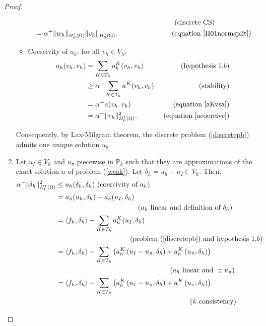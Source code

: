 \begin{proof}
\begin{enumerate}
\begin{itemize}
\begin{align*}
&\hspace{6.9cm} \text{ (discrete CS)}\\
&= \alpha^+ \|w_h\|_{H_0^1(\Omega)}\|v_h\|_{H_0^1(\Omega)}. \hspace{2.6cm}\text{ (equation \ref{H01normsplit})}
\end{align*}
\item Coercivity of $a_h$: for all $v_h\in V_h$, 
\begin{align*}
a_h(v_h,v_h) &= \sum_{K\in T_h} a_h^K(v_h,v_h) &\text{ (hypothesis }1.b)\\
&\geq \alpha^-\sum_{K\in T_h} a^K(v_h,v_h) &\text{ (stability)}\\
&= \alpha^- a(v_h,v_h) &\text{ (equation \ref{aKvsa})}\\
&= \alpha^- \|v_h\|_{H_0^1(\Omega)}^2. &\text{ (equation \ref{acoercive})}
\end{align*}
\end{itemize}
Consequently, by Lax-Milgram theorem, the discrete problem (\ref{discretepb}) admits one unique solution $u_h$.
\item Let $u_I\in V_h$ and $u_\pi$ piecewise in $\mathbb{P}_k$ such that they are approximations of the exact solution $u$ of problem (\ref{weak}). Let $\delta_h = u_h-u_I\in V_h$. Then, 
\begin{align*}
\alpha^-\|\delta_h\|^2_{H_0^1(\Omega)}
&\leq a_h(\delta_h,\delta_h) \text{ (coercivity of }a_h)\\
&= a_h(u_h,\delta_h) - a_h(u_I,\delta_h) \\
& \hspace{4.1cm}(a_h \text{ linear and definition of }\delta_h)\\
&= \langle f_h, \delta_h\rangle - \sum_{K\in T_h}a_h^K(u_I,\delta_h) \\
& \hspace{3.7cm}\text{(problem (\ref{discretepb}) and hypothesis }1.b)\\
&= \langle f_h, \delta_h\rangle - \sum_{K\in T_h}\left( a_h^K\left( u_I-u_\pi, \delta_h \right) + a_h^K\left( u_\pi,\delta_h\right) \right)\\
&\hspace{5.7cm} (a_h \text{ linear and }\pm u_\pi)\\
&= \langle f_h, \delta_h\rangle - \sum_{K\in T_h}\left( a_h^K\left( u_I-u_\pi, \delta_h \right) + a^K\left( u_\pi,\delta_h\right) \right)\\
&\hspace{6.7cm} (k\text{-consistency)}\\

\end{align*}
\end{enumerate}
\end{proof}
